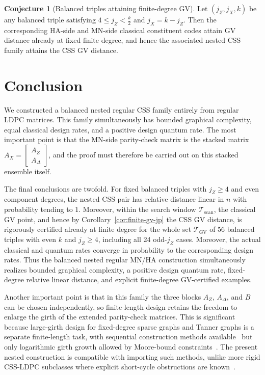 \documentclass[11pt]{article}
\theoremstyle{definition}
\newtheorem{conjecture}[theorem]{Conjecture}
\begin{document}
\begin{conjecture}[Balanced triples attaining finite-degree GV]\label{conj:balanced-gv-jp}
Let \((j_Z,j_X,k)\) be any balanced triple satisfying \(4\le j_Z<\frac{k}{2}\) and \(j_X=k-j_Z\).
Then the corresponding HA-side and MN-side classical constituent codes attain GV distance already at fixed finite degree, and hence the associated nested CSS family attains the CSS GV distance.
\end{conjecture}

\section{Conclusion}

We constructed a balanced nested regular CSS family entirely from regular LDPC matrices.
This family simultaneously has bounded graphical complexity, equal classical design rates,
and a positive design quantum rate.
The most important point is that the MN-side parity-check matrix is the stacked matrix \(A_X=\begin{bmatrix}A_Z\\ A_\Delta\end{bmatrix}\), and the proof must therefore be carried out on this stacked ensemble itself.

The final conclusions are twofold.
For fixed balanced triples with \(j_Z\ge4\) and even component degrees, the nested CSS pair has relative distance linear in \(n\) with probability tending to \(1\).
Moreover, within the search window \(\mathcal T_{\mathrm{scan}}\), the classical GV point, and hence by Corollary~\ref{cor:finite-gv-jp} the CSS GV distance, is rigorously certified already at finite degree for the whole set \(\mathcal T_{\mathrm{GV}}\) of 56 balanced triples with even \(k\) and \(j_Z\ge4\), including all 24 odd-\(j_Z\) cases.
Moreover, the actual classical and quantum rates converge in probability to the corresponding design rates.
Thus the balanced nested regular MN/HA construction simultaneously realizes bounded graphical complexity,
a positive design quantum rate, fixed-degree relative linear distance, and explicit finite-degree GV-certified examples.

Another important point is that in this family the three blocks \(A_Z\), \(A_\Delta\), and \(B\)
can be chosen independently, so finite-length design retains the freedom to enlarge the girth of the extended parity-check matrices.
This is significant because large-girth design for fixed-degree sparse graphs and Tanner graphs is a separate finite-length task, with sequential construction methods available~\cite{BayatiMS09,BayatiKMOS09} but only logarithmic girth growth allowed by Moore-bound constraints~\cite{AlonHL02}. The present nested construction is compatible with importing such methods, unlike more rigid CSS-LDPC subclasses where explicit short-cycle obstructions are known~\cite{AmirzadePS24}.
\end{document}
